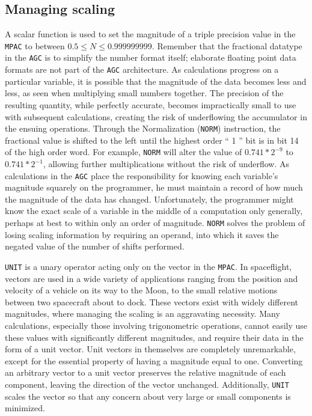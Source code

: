 \documentclass[refcap, oxford]{ahsan}
\begin{document}
\subsection{Managing scaling}
A scalar function is used to set the magnitude of a triple precision value in the \texttt{MPAC} to between $0.5 \leqslant N \leqslant 0.999999999$. Remember that the fractional datatype in the \texttt{AGC} is to simplify the number format itself; elaborate floating point data formats are not part of the \texttt{AGC} architecture. As calculations progress on a particular variable, it is possible that the magnitude of the data becomes less and less, as seen when multiplying small numbers together. The precision of the resulting quantity, while perfectly accurate, becomes impractically small to use with subsequent calculations, creating the risk of underflowing the accumulator in the ensuing operations. Through the Normalization (\texttt{NORM}) instruction, the fractional value is shifted to the left until the highest order `` 1 '' bit is in bit 14 of the high order word. For example, \texttt{NORM} will alter the value of $0.741 * 2^{-9}$ to $0.741 * 2^{-1}$, allowing further multiplications without the risk of underflow. As calculations in the \texttt{AGC} place the responsibility for knowing each variable's magnitude squarely on the programmer, he must maintain a record of how much the magnitude of the data has changed. Unfortunately, the programmer might know the exact scale of a variable in the middle of a computation only generally, perhaps at best to within only an order of magnitude. \texttt{NORM} solves the problem of losing scaling information by requiring an operand, into which it saves the negated value of the number of shifts performed.

\texttt{UNIT} is a unary operator acting only on the vector in the \texttt{MPAC}. In spaceflight, vectors are used in a wide variety of applications ranging from the position and velocity of a vehicle on its way to the Moon, to the small relative motions between two spacecraft about to dock. These vectors exist with widely different magnitudes, where managing the scaling is an aggravating necessity. Many calculations, especially those involving trigonometric operations, cannot easily use these values with significantly different magnitudes, and require their data in the form of a unit vector. Unit vectors in themselves are completely unremarkable, except for the essential property of having a magnitude equal to one. Converting an arbitrary vector to a unit vector preserves the relative magnitude of each component, leaving the direction of the vector unchanged. Additionally, \texttt{UNIT} scales the vector so that any concern about very large or small components is minimized.
\end{document}
